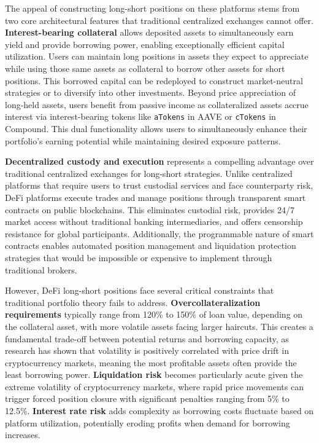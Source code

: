 \documentclass{article}
\theoremstyle{definition}
\begin{document}
The appeal of constructing long-short positions on these platforms stems from two core architectural features that traditional centralized exchanges cannot offer. \textbf{Interest-bearing collateral} allows deposited assets to simultaneously earn yield and provide borrowing power, enabling exceptionally efficient capital utilization. Users can maintain long positions in assets they expect to appreciate while using those same assets as collateral to borrow other assets for short positions. This borrowed capital can be redeployed to construct market-neutral strategies or to diversify into other investments. Beyond price appreciation of long-held assets, users benefit from passive income as collateralized assets accrue interest via interest-bearing tokens like \texttt{aTokens} in AAVE or \texttt{cTokens} in Compound. This dual functionality allows users to simultaneously enhance their portfolio's earning potential while maintaining desired exposure patterns.

\textbf{Decentralized custody and execution} represents a compelling advantage over traditional centralized exchanges for long-short strategies. Unlike centralized platforms that require users to trust custodial services and face counterparty risk, DeFi platforms execute trades and manage positions through transparent smart contracts on public blockchains. This eliminates custodial risk, provides 24/7 market access without traditional banking intermediaries, and offers censorship resistance for global participants. Additionally, the programmable nature of smart contracts enables automated position management and liquidation protection strategies that would be impossible or expensive to implement through traditional brokers.

However, DeFi long-short positions face several critical constraints that traditional portfolio theory fails to address. \textbf{Overcollateralization requirements} typically range from 120\% to 150\% of loan value, depending on the collateral asset, with more volatile assets facing larger haircuts. This creates a fundamental trade-off between potential returns and borrowing capacity, as research has shown that volatility is positively correlated with price drift in cryptocurrency markets, meaning the most profitable assets often provide the least borrowing power. \textbf{Liquidation risk} becomes particularly acute given the extreme volatility of cryptocurrency markets, where rapid price movements can trigger forced position closure with significant penalties ranging from 5\% to 12.5\%. \textbf{Interest rate risk} adds complexity as borrowing costs fluctuate based on platform utilization, potentially eroding profits when demand for borrowing increases.
\end{document}
